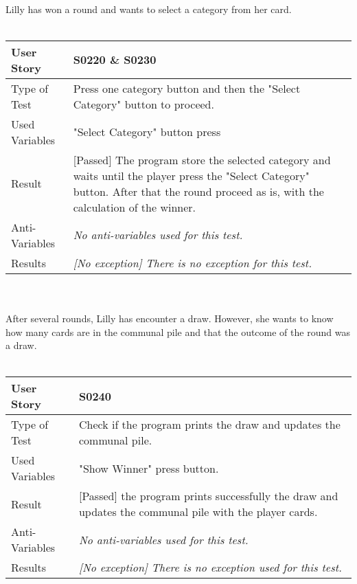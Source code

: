 \vspace{0.2cm}\\  
Lilly has won a round and wants to select a category from her card.\\
\vspace{0.2cm}\\ 
\begin{tabular}{l | p{12cm}}
User Story & \textbf{S0220 \& S0230}\\ \hline
Type of Test & Press one category button and then the "Select Category" button to proceed.\\ \hline
Used Variables & "Select Category" button press\\ \hline
Result & [Passed] The program store the selected category and waits until the player press the "Select Category" button. After that the round proceed as is, with the calculation of the winner.\\ \hline
Anti-Variables & \emph{No anti-variables used for this test.}\\ \hline
Results & \emph{[No exception] There is no exception for this test.}\\ \hline
\end{tabular}\\
\vspace{0.2cm}\\
After several rounds, Lilly has encounter a draw. However, she wants to know how many cards are in the communal pile and that the outcome of the round was a draw.\\
\vspace{0.2cm}\\   
\begin{tabular}{l | p{12cm}}
User Story & \textbf{S0240}\\ \hline
Type of Test & Check if the program prints the draw and updates the communal pile.\\ \hline
Used Variables & "Show Winner" press button.\\ \hline
Result & [Passed] the program prints successfully the draw and updates the communal pile with the player cards.\\ \hline
Anti-Variables & \emph{No anti-variables used for this test.}\\ \hline
Results & \emph{[No exception] There is no exception used for this test.}\\ \hline
\end{tabular}\\
\vspace{0.2cm}\\
